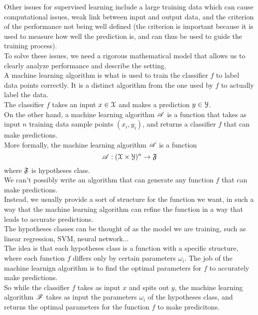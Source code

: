 \documentclass[12pt]{article}
\begin{document}
Other issues for supervised
learning include
a large training data which
can cause computational issues,
weak link between input
and output data,
and the criterion of the performance
not being well defined
(the criterion is important
because it is used to measure
how well the prediction is,
and can thus be used to guide
the training process). \\

To solve these issues,
we need a rigorous mathematical model
that allows us to clearly analyze
performance and describe the setting. \\

A machine learning algorithm is
what is used to train the classifier
$f$ to label data points correctly.
It is a distinct algorithm from the one
used by $f$ to actually label the data. \\
The classifier $f$
takes an input $x \in \mathcal{X}$
and makes a prediction $y \in \mathcal{Y}$. \\
On the other hand,
a machine learning algorithm $\mathscr{A}$
is a function that takes as input
$n$ training data sample points
$(x_i, y_i)$,
and returns a classifier $f$
that can make predictions.  \\

More formally, the machine learning
algorithm $\mathscr{A}$ is a function
\[ \mathscr{A}: (\mathcal{X} \times \mathcal{Y})^n
\to \mathfrak{F} \]
where $\mathfrak{F}$ is hypotheses class. \\
We can't possibly write an algorithm
that can generate any function
$f$ that can make predictions. \\
Instead, we usually provide a sort of
structure for the function we want,
in such a way that the machine learning
algorithm can refine the function
in a way that leads to accurate
predictions. \\

The hypotheses classes can be thought
of as the model we are training,
such as linear regression, SVM,
neural network... \\
The idea is that each hypotheses
class is a function
with a specific structure,
where each function $f$ differs only
by certain parameters $\omega_i$.
The job of the machine learnign algorithm
is to find the optimal parameters
for $f$ to accurately make
predictions. \\ 
So while the classifier $f$
takes as input $x$
and spits out $y$,
the machine learning algorithm $\mathscr{F}$
takes as input the parameters $\omega_i$
of the hypotheses class,
and returns the optimal parameters
for the function $f$ to make
predicitons. \\
\end{document}
